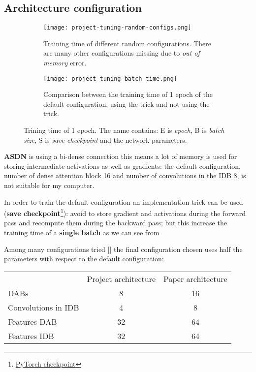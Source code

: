 \subsection{Architecture configuration}
\begin{figure}
    \begin{subfigure}{\textwidth}
        \centering
        \texttt{[image: project-tuning-random-configs.png]}
        \caption{Training time of different random configurations. There are many other configurations missing due to \textit{out of memory} error.}\label{project:random-configurations}
    \end{subfigure}
    \begin{subfigure}{\textwidth}
        \centering
        \texttt{[image: project-tuning-batch-time.png]}        
        \caption{Comparison between the training time of 1 epoch of the default configuration, using the trick and not using the trick.}\label{project:batch-time}
    \end{subfigure}

    \caption{Trining time of 1 epoch. The name contains: E is \textit{epoch}, B is \textit{batch size}, S is \textit{save checkpoint} and the network parameters.}    
\end{figure}

\textbf{ASDN} is using a bi-dense connection this means a lot of memory is used for storing intermediate activations as well as gradients: the default configuration, number of dense attention block 16 and number of convolutions in the IDB 8, is not suitable for my computer.

In order to train the default configuration an implementation trick can be used (\textbf{save checkpoint}\footnote{\href{https://pytorch.org/docs/stable/checkpoint.html}{PyTorch checkpoint}}): avoid to store gradient and activations during the forward pass and recompute them during the backward pass; but this increase the training time of a \textbf{single batch} as we can see from 

Among many configurations tried [] the final configuration chosen uses half the parameters with respect to the default configuration:

\begin{tabular}{lcc}
    & Project architecture & Paper architecture \\
    DABs & 8 & 16 \\
    Convolutions in IDB & 4 & 8 \\
    Features DAB & 32 & 64 \\
    Features IDB & 32 & 64 
\end{tabular}

